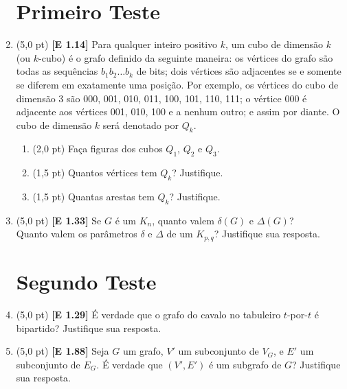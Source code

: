 \documentclass[12pt,a4paper,oneside]{article}
\begin{document}
\begin{enumerate}
	
	\section*{Primeiro Teste}
	
	\item (5,0 pt) {\bf [E 1.14]} Para qualquer inteiro positivo $k$, um cubo de dimensão $k$ (ou $k$-cubo) é o grafo definido da seguinte maneira: os vértices do grafo são todas as sequências $b_1 b_2 \ldots b_k$ de bits; dois vértices são adjacentes se e somente se
	diferem em exatamente uma posição. Por exemplo, os vértices do cubo de dimensão 3 são 000, 001, 010, 011, 100, 101, 110, 111; o vértice 000 é adjacente aos vértices 001, 010, 100 e a nenhum outro; e assim por diante. O cubo de dimensão $k$ será denotado por $Q_k$.
	\begin{enumerate}
		\item (2,0 pt) Faça figuras dos cubos $Q_1$, $Q_2$ e $Q_3$. 
		\item (1,5 pt) Quantos vértices tem $Q_k$? Justifique. 
		\item (1,5 pt) Quantas arestas tem $Q_k$? Justifique.
	\end{enumerate}
	
	\item (5,0 pt) {\bf [E 1.33]} Se $G$ é um $K_n$, quanto valem $\delta(G)$ e $\Delta(G)$? \\Quanto valem os parâmetros $\delta$ e $\Delta$ de um $K_{p,q}$? Justifique sua resposta.
	
	\section*{Segundo Teste}
	
	\item (5,0 pt) {\bf [E 1.29]} É verdade que o grafo do cavalo no tabuleiro $t$-por-$t$ é bipartido? Justifique sua resposta.
	
	\item (5,0 pt) {\bf [E 1.88]} Seja $G$ um grafo, $V'$ um subconjunto de $V_G$, e $E'$ um subconjunto de $E_G$. É verdade que $(V', E')$ é um subgrafo de $G$? Justifique sua resposta.
	
	\end{enumerate}
\end{document}
